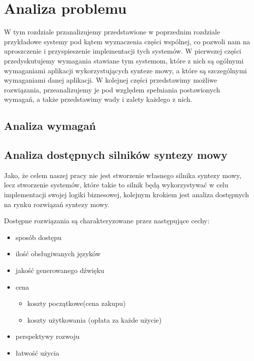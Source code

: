 
\chapter{Analiza problemu} %



\ifpdf
    \graphicspath{{X/figures/PNG/}{X/figures/PDF/}{X/figures/}}
\else
    \graphicspath{{X/figures/EPS/}{X/figures/}}
\fi



W tym rozdziale przanalizujemy przedstawione w poprzednim rozdziale przykładowe systemy pod kątem wyznaczenia części wspólnej, co pozwoli nam na uproszczenie i przyspieszenie implementacji tych systemów. W pierwszej części przedyskutujemy wymagania stawiane tym systemom, które z nich są ogólnymi wymaganiami aplikacji wykorzystujących synteze mowy, a które są szczególnymi wymaganiami danej aplikacji. W kolejnej części przedstawimy możliwe rozwiązania, przeanalizujemy je pod względem spełniania postawionych wymagań, a także przedstawimy wady i zalety każdego z nich.

\section {Analiza wymagań}

\section {Analiza dostępnych silników syntezy mowy}

Jako, że celem naszej pracy nie jest stworzenie własnego silnika syntezy mowy, lecz stworzenie systemów, które takie to silnik będą wykorzystywać w celu implementacji swojej logiki biznesowej, kolejnym krokiem jest analiza dostępnych na rynku rozwiązań syntezy mowy. 

Dostępne rozwiązania są charakteryzowane przez następujące cechy:
\begin{itemize}
	\item sposób dostępu
	\item ilość obsługiwanych języków
	\item jakość generowanego dźwięku
	\item cena
	\begin{itemize}
		\item koszty początkowe(cena zakupu)
		\item koszty użytkowania (opłata za każde użycie)
	\end{itemize}
	\item perspektywy rozwoju
	\item łatwość użycia
\end{itemize}

